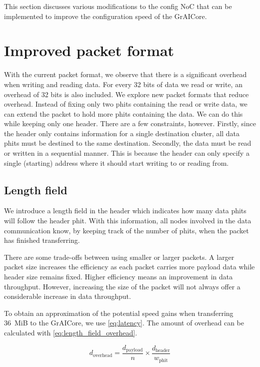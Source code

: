 This section discusses various modifications to the config NoC that can be implemented to improve the configuration speed of the GrAICore.

\section{Improved packet format}
With the current packet format, we observe that there is a significant overhead when writing and reading data.
For every 32 bits of data we read or write, an overhead of 32 bits is also included.
We explore new packet formats that reduce overhead.
Instead of fixing only two phits containing the read or write data, we can extend the packet to hold more phits containing the data.
We can do this while keeping only one header.
There are a few constraints, however.
Firstly, since the header only contains information for a single destination cluster, all data phits must be destined to the same destination.
Secondly, the data must be read or written in a sequential manner.
This is because the header can only specify a single (starting) address where it should start writing to or reading from.

\subsection{Length field}
We introduce a length field in the header which indicates how many data phits will follow the header phit.
With this information, all nodes involved in the data communication know, by keeping track of the number of phits, when the packet has finished transferring. 

There are some trade-offs between using smaller or larger packets.
A larger packet size increases the efficiency as each packet carries more payload data while header size remains fixed.
Higher efficiency means an improvement in data throughput.
However, increasing the size of the packet will not always offer a considerable increase in data throughput.

To obtain an approximation of the potential speed gains when transferring \SI{36}{MiB} to the GrAICore, we use \cref{eq:latency}.
The amount of overhead can be calculated with \cref{eq:length_field_overhead}.

\begin{equation}
    d_{\text{overhead}} = \frac{d_{\text{payload}}}{n} \times \frac{d_{\text{header}}}{w_{\text{phit}}}
\label{eq:length_field_overhead}
\end{equation}

